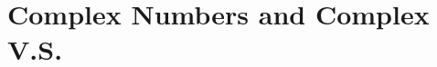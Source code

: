 \documentclass[oneside, 12pt]{book}
\newcommand{\real}{\mathbb{R}}
\newcommand{\map}[3]{\text{$\left[#1\right]_{#2}^{#3}$}}
\newcommand{\vx}{\mathbf{x}}
\newcommand{\ve}{\mathbf{e}}
\newcommand{\vy}{\mathbf{y}}
\begin{document}
\begin{enumerate}
\end{enumerate}

\chapter{Complex Numbers and Complex V.S.}
\end{document}
